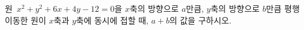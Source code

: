 원~$x^2+y^2+6x+4y-12=0$을 $x$축의 방향으로 $a$만큼, $y$축의 방향으로 $b$만큼 평행이동한 원이 $x$축과 $y$축에 동시에 접할 때, $a+b$의 값을 구하시오. 
